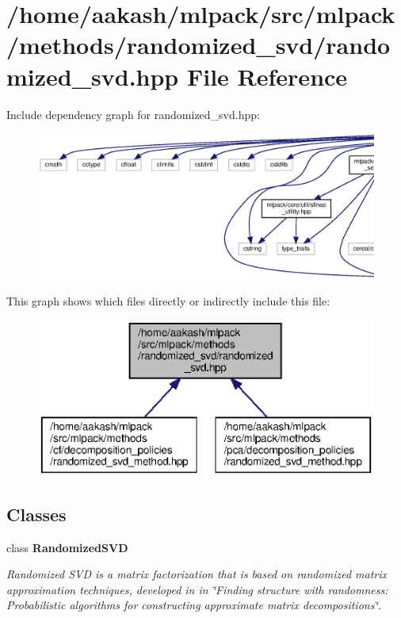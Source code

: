 \section{/home/aakash/mlpack/src/mlpack/methods/randomized\+\_\+svd/randomized\+\_\+svd.hpp File Reference}
\label{randomized__svd_8hpp}
Include dependency graph for randomized\+\_\+svd.\+hpp\+:
\nopagebreak
\begin{figure}[H]
\begin{center}
\leavevmode
\includegraphics[width=350pt]{randomized__svd_8hpp__incl}
\end{center}
\end{figure}
This graph shows which files directly or indirectly include this file\+:
\nopagebreak
\begin{figure}[H]
\begin{center}
\leavevmode
\includegraphics[width=350pt]{randomized__svd_8hpp__dep__incl}
\end{center}
\end{figure}
\subsection*{Classes}
\begin{DoxyCompactItemize}
\item 
class \textbf{ Randomized\+S\+VD}
\begin{DoxyCompactList}\small\item\em Randomized S\+VD is a matrix factorization that is based on randomized matrix approximation techniques, developed in in \char`\"{}\+Finding structure with randomness\+:
\+Probabilistic algorithms for constructing approximate matrix decompositions\char`\"{}. \end{DoxyCompactList}\end{DoxyCompactItemize}
